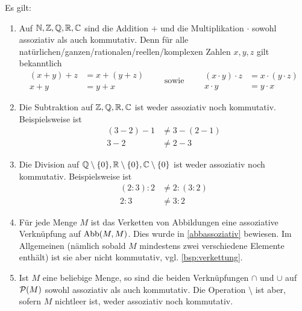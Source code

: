 \begin{bsp}
    Es gilt:
    \begin{enumerate}
        \item Auf $\mathbb N,\mathbb Z,\mathbb Q,\mathbb R,\mathbb C$ sind die Addition $+$ und die Multiplikation $\cdot$ sowohl assoziativ als auch kommutativ. Denn für alle natürlichen/ganzen/rationalen/reellen/komplexen Zahlen $x,y,z$ gilt bekanntlich
            \[ \begin{split}
                    (x+y)+z& = x+(y+z)  \\
                x+y     & = y+x
                \end{split} \qquad \text{sowie}\qquad \begin{split}
                    (x\cdot y)\cdot z & = x\cdot (y\cdot z)  \\
                    x\cdot y & = y\cdot x
                \end{split} \]
        \item Die Subtraktion auf $\mathbb Z,\mathbb Q,\mathbb R,\mathbb C$ ist weder assoziativ noch kommutativ. Beispielsweise ist
        \begin{align*}
            (3-2)-1 &\neq  3-(2-1)  \\
            3-2 &\neq 2-3
        \end{align*}
        \item Die Division auf $\mathbb Q\setminus \{0\},\mathbb R\setminus \{0\},\mathbb C\setminus \{0\}$ ist weder assoziativ noch kommutativ. Beispielsweise ist
        \begin{align*}
            (2:3):2 &\neq 2:(3:2) \\
            2 : 3 & \neq 3:2
        \end{align*}
        \item Für jede Menge $M$ ist das Verketten von Abbildungen eine assoziative Verknüpfung auf $\operatorname{Abb}(M,M)$. Dies wurde in \cref{abbassoziativ} bewiesen. Im Allgemeinen (nämlich sobald $M$ mindestens zwei verschiedene Elemente enthält) ist sie aber nicht kommutativ, vgl. \cref{bsp:verkettung}.
        \item Ist $M$ eine beliebige Menge, so sind die beiden Verknüpfungen $\cap$ und $\cup$ auf $\mathcal P(M)$ sowohl assoziativ als auch kommutativ. Die Operation $\setminus$ ist aber, sofern $M$ nichtleer ist, weder assoziativ noch kommutativ.
    \end{enumerate}
\end{bsp}


